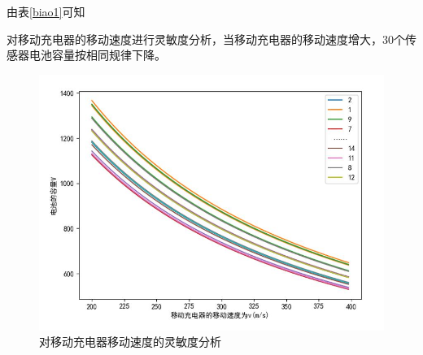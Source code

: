 \documentclass{whutmod}
\begin{document}
  			由表\ref{biao1}可知
			
			对移动充电器的移动速度进行灵敏度分析，当移动充电器的移动速度增大，$30$个传感器电池容量按相同规律下降。
			\begin{figure}[H]
				\centering
				\includegraphics[width=\textwidth]{figures/2333.jpg}
				\caption{对移动充电器移动速度的灵敏度分析}\label{lssss}
			\end{figure}
		
\end{document}
